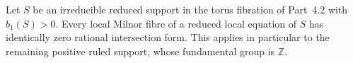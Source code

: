 
\begin{proposition}[P4.51]\hypertarget{tag-02XQ}{}\label{night:P4.51}\label{stmt:P4.51}


Let $S$ be an irreducible reduced support in the torus
fibration of Part~4.2 with $b_1(S)>0$. Every local
Milnor fibre of a reduced local equation of $S$ has
identically zero rational intersection form. This applies
in particular to the remaining positive ruled support,
whose fundamental group is $\mathbb Z$.
\end{proposition}

